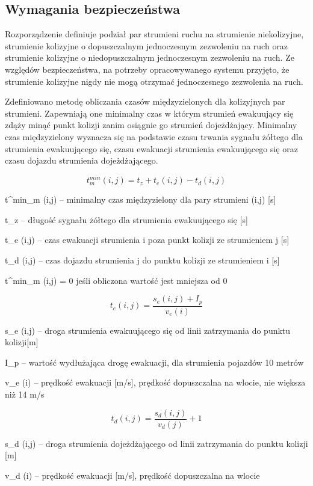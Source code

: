 \subsection{Wymagania bezpieczeństwa}
Rozporządzenie definiuje podział par strumieni ruchu na strumienie niekolizyjne, strumienie kolizyjne o dopuszczalnym jednoczesnym zezwoleniu na ruch oraz strumienie kolizyjne o niedopuszczalnym jednoczesnym zezwoleniu na ruch. Ze względów bezpieczeństwa, na potrzeby opracowywanego systemu przyjęto, że strumienie kolizyjne nigdy nie mogą otrzymać jednoczesnego zezwolenia na ruch.

Zdefiniowano metodę obliczania czasów międzyzielonych dla kolizyjnych par strumieni. Zapewniają one minimalny czas w którym strumień ewakuujący się zdąży minąć punkt kolizji zanim osiągnie go strumień dojeżdżający. Minimalny czas międzyzielony wyznacza się na podstawie czasu trwania sygnału żółtego dla strumienia ewakuującego się, czasu ewakuacji strumienia ewakuującego się oraz czasu dojazdu strumienia dojeżdżającego.

\begin{equation}
	t^{min}_{m} (i,j) = t_{z} + t_{e} (i,j) - t_{d} (i,j)
\end{equation}

t^{min}_{m} (i,j) \textrm{ -- minimalny czas międzyzielony dla pary strumieni (i,j) [s]}

t_{z} \textrm{ -- długość sygnału żółtego dla strumienia ewakuującego się [s]}

t_{e} (i,j) \textrm{ -- czas ewakuacji strumienia i poza punkt kolizji ze strumieniem j [s]}

t_{d} (i,j) \textrm{ -- czas dojazdu strumienia j do punktu kolizji ze strumieniem i [s]}

t^{min}_{m} (i,j) = 0 \textrm{ jeśli obliczona wartość jest mniejsza od 0}

\begin{equation}
	t_{e} (i,j) = \frac{s_{e} (i,j) + I_p}{v_{e} (i)}
\end{equation}

s_{e} (i,j) \textrm{ -- droga strumienia ewakuującego się od linii zatrzymania do punktu kolizji[m]}

I_p \textrm{ -- wartość wydłużająca drogę ewakuacji, dla strumienia pojazdów 10 metrów}

v_{e} (i) \textrm{ -- prędkość ewakuacji [m/s], prędkość dopuszczalna na wlocie, nie większa niż 14 m/s}

\begin{equation}
	t_{d} (i,j) = \frac{s_{d} (i,j)}{v_{d} (j)} + 1
\end{equation}

s_{d} (i,j) \textrm{ -- droga strumienia dojeżdżającego od linii zatrzymania do punktu kolizji [m]}

v_{d} (i) \textrm{ -- prędkość ewakuacji [m/s], prędkość dopuszczalna na wlocie}